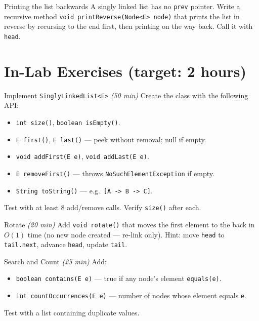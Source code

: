 \documentclass[11pt]{article}
\begin{document}
\begin{tryit}{Printing the list backwards}
A singly linked list has no \texttt{prev} pointer.
Write a recursive method \texttt{void printReverse(Node<E> node)} that prints the list
in reverse by recursing to the end first, then printing on the way back.
Call it with \texttt{head}.
\end{tryit}

\section*{In-Lab Exercises (target: 2 hours)}

\begin{labexercise}{Implement \texttt{SinglyLinkedList<E>} \hfill {\small \itshape (50 min)}}
Create the class with the following API:
\begin{itemize}[leftmargin=*,nosep]
  \item \texttt{int size()}, \texttt{boolean isEmpty()}.
  \item \texttt{E first()}, \texttt{E last()} --- peek without removal; null if empty.
  \item \texttt{void addFirst(E e)}, \texttt{void addLast(E e)}.
  \item \texttt{E removeFirst()} --- throws \texttt{NoSuchElementException} if empty.
  \item \texttt{String toString()} --- e.g.\ \texttt{[A -> B -> C]}.
\end{itemize}
Test with at least 8 add/remove calls. Verify \texttt{size()} after each.
\end{labexercise}

\begin{labexercise}{Rotate \hfill {\small \itshape (20 min)}}
Add \texttt{void rotate()} that moves the first element to the back in $O(1)$ time
(no new node created --- re-link only).
Hint: move \texttt{head} to \texttt{tail.next}, advance \texttt{head}, update \texttt{tail}.
\end{labexercise}

\begin{labexercise}{Search and Count \hfill {\small \itshape (25 min)}}
Add:
\begin{itemize}[leftmargin=*,nosep]
  \item \texttt{boolean contains(E e)} --- true if any node's element \texttt{equals(e)}.
  \item \texttt{int countOccurrences(E e)} --- number of nodes whose element equals \texttt{e}.
\end{itemize}
Test with a list containing duplicate values.
\end{labexercise}
\end{document}
